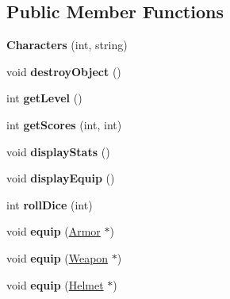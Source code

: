 \subsection*{Public Member Functions}
\begin{DoxyCompactItemize}
\item 
\hypertarget{class_characters_a643e74c31b4c20ad614c89e0e046d35f}{}\label{class_characters_a643e74c31b4c20ad614c89e0e046d35f} 
{\bfseries Characters} (int, string)
\item 
\hypertarget{class_characters_a6ec320af5d1526eed47070bca6e4d847}{}\label{class_characters_a6ec320af5d1526eed47070bca6e4d847} 
void {\bfseries destroy\+Object} ()
\item 
\hypertarget{class_characters_a4d7ffd0091e9e37d6da1ad0f0ceaa48f}{}\label{class_characters_a4d7ffd0091e9e37d6da1ad0f0ceaa48f} 
int {\bfseries get\+Level} ()
\item 
\hypertarget{class_characters_a498fb8e0caaa6503fbb1e1694a082c4c}{}\label{class_characters_a498fb8e0caaa6503fbb1e1694a082c4c} 
int {\bfseries get\+Scores} (int, int)
\item 
\hypertarget{class_characters_adc5a2d1c1aabab2b9915f5ce0e2707f9}{}\label{class_characters_adc5a2d1c1aabab2b9915f5ce0e2707f9} 
void {\bfseries display\+Stats} ()
\item 
\hypertarget{class_characters_acf1c5f4228c0ac33361c0ad5211aa7a9}{}\label{class_characters_acf1c5f4228c0ac33361c0ad5211aa7a9} 
void {\bfseries display\+Equip} ()
\item 
\hypertarget{class_characters_afa9c56654b160d186ce3fd8259f8f180}{}\label{class_characters_afa9c56654b160d186ce3fd8259f8f180} 
int {\bfseries roll\+Dice} (int)
\item 
\hypertarget{class_characters_aef7eb04814a81a6043dad4033954e4ad}{}\label{class_characters_aef7eb04814a81a6043dad4033954e4ad} 
void {\bfseries equip} (\hyperlink{class_armor}{Armor} $\ast$)
\item 
\hypertarget{class_characters_a1f334afbb902a822bbb308634683a1a4}{}\label{class_characters_a1f334afbb902a822bbb308634683a1a4} 
void {\bfseries equip} (\hyperlink{class_weapon}{Weapon} $\ast$)
\item 
\hypertarget{class_characters_a5626b3e730753e2da255debb2c692011}{}\label{class_characters_a5626b3e730753e2da255debb2c692011} 
void {\bfseries equip} (\hyperlink{class_helmet}{Helmet} $\ast$)
\item 
\hypertarget{class_characters_a65af5ec102b0bfb39cdd84d6471f8529}{}\label{class_characters_a65af5ec102b0bfb39cdd84d6471f8529} 

\end{DoxyCompactItemize}

